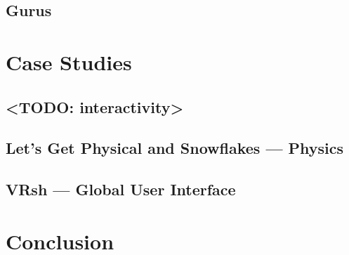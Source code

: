 \documentclass[conference,12pt]{IEEEtran}
\newcommand\name{VRsh}
\begin{document}
\subsection{Gurus} %


\section{Case Studies}\label{sec:case-studies}

\subsection{<TODO: interactivity>}

\subsection{Let's Get Physical and Snowflakes --- Physics}

\subsection{{\name} --- Global User Interface}

\section{Conclusion}\label{sec:conclusion}

{\printbibliography}
\end{document}
